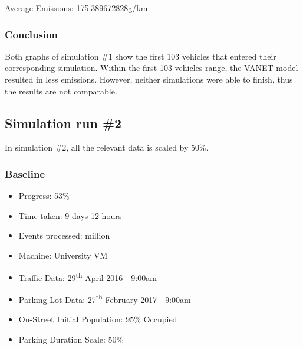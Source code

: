 Average Emissions: 175.389672828g/km

\subsubsection{Conclusion}
Both graphs of simulation \#1 show the first 103 vehicles that entered their corresponding simulation. Within the first 103 vehicles range, the \ac{VANET} model resulted in less emissions. However, neither simulations were able to finish, thus the results are not comparable.

\pagebreak

\subsection{Simulation run \#2}
In simulation \#2, all the relevant data is scaled by 50\%. 
\subsubsection{Baseline}
\begin{itemize}
    \setlength\itemsep{0em}
    \item Progress: 53\%
    \item Time taken: 9 days 12 hours
    \item Events processed:  million
    \item Machine: University VM
    \item Traffic Data: 29\textsuperscript{th} April 2016 - 9:00am
    \item Parking Lot Data: 27\textsuperscript{th} February 2017 - 9:00am
    \item On-Street Initial Population: 95\% Occupied
    \item Parking Duration Scale: 50\%
\end{itemize}

